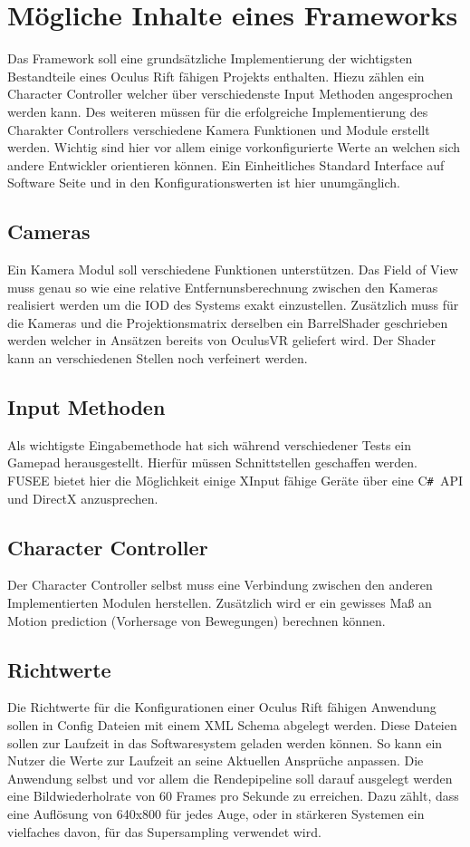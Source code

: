\documentclass[pagesize, paper=a4, fontsize=12pt,titlepage=true, headings=small, headnosepline, abstractoff, liststotoc, nochapterprefix, plainheadsepline]{scrreprt}
\newcommand{\CSS}{C\texttt{\# }}
\begin{document}
\section{Mögliche Inhalte eines Frameworks}
Das Framework soll eine grundsätzliche Implementierung der wichtigsten Bestandteile eines Oculus Rift fähigen Projekts enthalten. Hiezu zählen ein Character Controller welcher über verschiedenste Input Methoden angesprochen werden kann. Des weiteren müssen für die erfolgreiche Implementierung des Charakter Controllers verschiedene Kamera Funktionen und Module erstellt werden. Wichtig sind hier vor allem einige vorkonfigurierte Werte an welchen sich andere Entwickler orientieren können. Ein Einheitliches Standard Interface auf Software Seite und in den Konfigurationswerten ist hier unumgänglich.

\subsection{Cameras}
Ein Kamera Modul soll verschiedene Funktionen unterstützen. Das Field of View muss genau  so wie eine relative Entfernunsberechnung zwischen den Kameras realisiert werden um die IOD des Systems exakt einzustellen. Zusätzlich muss für die Kameras und die Projektionsmatrix derselben ein BarrelShader geschrieben werden welcher in Ansätzen bereits von OculusVR geliefert wird. Der Shader kann an verschiedenen Stellen noch verfeinert werden.
\subsection{Input Methoden}
Als wichtigste Eingabemethode hat sich während verschiedener Tests ein Gamepad herausgestellt. Hierfür müssen Schnittstellen geschaffen werden. FUSEE bietet hier die Möglichkeit einige XInput fähige Geräte über eine \CSS API und DirectX anzusprechen. 
\subsection{Character Controller}
Der Character Controller selbst muss eine Verbindung zwischen den anderen Implementierten Modulen herstellen. Zusätzlich wird er ein gewisses Maß an Motion prediction (Vorhersage von Bewegungen) berechnen können.
\subsection{Richtwerte}
Die Richtwerte für die Konfigurationen einer Oculus Rift fähigen Anwendung sollen in Config Dateien mit einem XML Schema abgelegt werden. Diese Dateien sollen zur Laufzeit in das Softwaresystem geladen werden können. So kann ein Nutzer die Werte zur Laufzeit an seine Aktuellen Ansprüche anpassen. Die Anwendung selbst und vor allem die Rendepipeline soll darauf ausgelegt werden eine Bildwiederholrate von 60 Frames pro Sekunde zu erreichen. Dazu zählt, dass eine Auflösung von 640x800 für jedes Auge, oder in stärkeren Systemen ein vielfaches davon, für das Supersampling verwendet wird.
\end{document}
